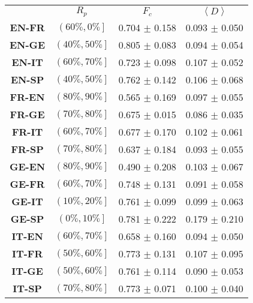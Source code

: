 

\begin{table}[t]
	\centering
	\begin{tabular}{cccc}
	          & \textbf{$R_{p}$} & \textbf{$F_{c}$} & \textbf{$\left\langle D \right\rangle$} \\[2pt]
		\textbf{EN-FR} & $\left( 60\%, 0\% \right]$  & 0.704 $\pm$ 0.158 &  0.093 $\pm$ 0.050 \\
		\textbf{EN-GE} & $\left( 40\%, 50\% \right]$ & 0.805 $\pm$ 0.083 &  0.094 $\pm$ 0.054 \\
		\textbf{EN-IT} & $\left( 60\%, 70\% \right]$ & 0.723 $\pm$ 0.098 &  0.107 $\pm$ 0.052 \\ 
		\textbf{EN-SP} & $\left( 40\%, 50\% \right]$ & 0.762 $\pm$ 0.142 &  0.106 $\pm$ 0.068 \\[4pt]
		
		\textbf{FR-EN} & $\left( 80\%, 90\% \right]$ & 0.565 $\pm$ 0.169 &  0.097 $\pm$ 0.055 \\
	    \textbf{FR-GE} & $\left( 70\%, 80\% \right]$ & 0.675 $\pm$ 0.015 &  0.086 $\pm$ 0.035 \\
		\textbf{FR-IT} & $\left( 60\%, 70\% \right]$ & 0.677 $\pm$ 0.170 &  0.102 $\pm$ 0.061 \\ 
		\textbf{FR-SP} & $\left( 70\%, 80\% \right]$ & 0.637 $\pm$ 0.184 &  0.093 $\pm$ 0.055 \\[4pt]
		
		\textbf{GE-EN} & $\left( 80\%, 90\% \right]$ & 0.490 $\pm$ 0.208 &  0.103 $\pm$ 0.067 \\
		\textbf{GE-FR} & $\left( 60\%, 70\% \right]$ & 0.748 $\pm$ 0.131 &  0.091 $\pm$ 0.058 \\
		\textbf{GE-IT} & $\left( 10\%, 20\% \right]$ & 0.761 $\pm$ 0.099 &  0.099 $\pm$ 0.063 \\
		\rowcolor{malo}\textbf{GE-SP} & $\left( 0\%, 10\% \right]$ & 0.781 $\pm$ 0.222 &  0.179 $\pm$ 0.210 \\
		[4pt]
		
		\textbf{IT-EN} & $\left( 60\%, 70\% \right]$ & 0.658 $\pm$ 0.160 &  0.094 $\pm$ 0.050 \\
		\textbf{IT-FR} & $\left( 50\%, 60\% \right]$ & 0.773 $\pm$ 0.131 &  0.107 $\pm$ 0.095 \\
		\textbf{IT-GE} & $\left( 50\%, 60\% \right]$ & 0.761 $\pm$ 0.114 &  0.090 $\pm$ 0.053  \\
		\rowcolor{bueno}\textbf{IT-SP} & $\left( 70\%, 80\% \right]$ & 0.773 $\pm$ 0.071 &  0.100 $\pm$ 0.040 \\[4pt]
		

\end{tabular}
\end{table}
